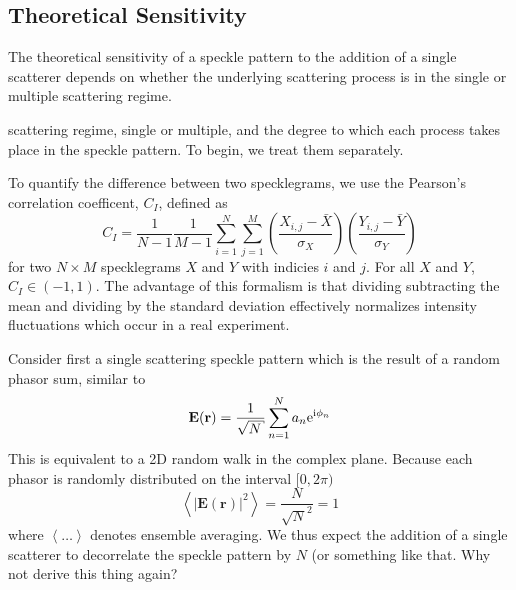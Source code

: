 \subsection{Theoretical Sensitivity}
The theoretical sensitivity of a speckle pattern to the addition of a
single scatterer depends on whether the underlying scattering process is in
the single or multiple scattering regime.

scattering regime, single or multiple, and
the degree to which each process takes place in the speckle pattern.  To
begin, we treat them separately.


To quantify the difference between two specklegrams, we use the Pearson's
correlation coefficent, $C_I$, defined as 
\begin{equation}
C_I = \frac{1}{N-1} \frac{1}{M-1} 
\sum_{i=1}^N \sum_{j=1}^M 
\left(\frac{X_{i,j} - \bar{X}}{\sigma_X}\right)
\left(\frac{Y_{i,j} - \bar{Y}}{\sigma_Y}\right)
\end{equation}
for two $N \times M$ specklegrams $X$ and $Y$ with indicies $i$ and $j$.
For all $X$ and $Y$, $C_I \in (-1,1)$.
The advantage of this formalism is that dividing subtracting the mean and
dividing by the standard deviation effectively normalizes intensity
fluctuations which occur in a real experiment.

Consider first a single scattering speckle pattern which is the result of a
random phasor sum, similar to 
\begin{equation}
\mathbf{E}(\mathbf{r}) = \frac{1}{\sqrt{N}} \sum_{n=1}^{N} a_n \me^{\mi \phi_n}
\end{equation}
This is equivalent to a 2D random walk in the complex plane.  Because each
phasor is randomly distributed on the interval $[0,2\pi)$
\begin{equation}
\left<|\mathbf{E}(\mathbf{r})|^2\right> = \frac{N}{\sqrt{N}^2} = 1
\end{equation}
where $\left<\dots\right>$ denotes ensemble averaging.  We thus expect the
addition of a single scatterer to decorrelate the speckle pattern by $N$
(or something like that.  Why not derive this thing again?

